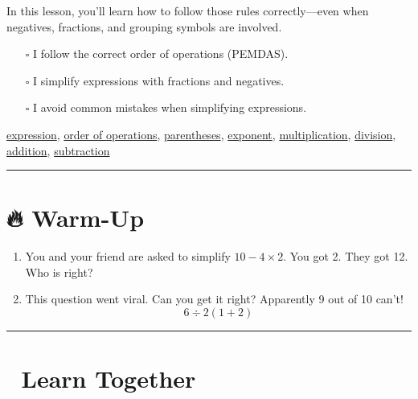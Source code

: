 \documentclass[
  letterpaper,
  DIV=11,
  numbers=noendperiod]{scrreprt}
\providecommand{\tightlist}{%
  \setlength{\itemsep}{0pt}\setlength{\parskip}{0pt}}
\begin{document}
In this lesson, you'll learn how to follow those rules correctly---even
when negatives, fractions, and grouping symbols are involved.

\begin{itemize}
\tightlist
\item[$\square$]
  I follow the correct order of operations (PEMDAS).
\item[$\square$]
  I simplify expressions with fractions and negatives.
\item[$\square$]
  I avoid common mistakes when simplifying expressions.
\end{itemize}

\href{./glossary.html\#glossary-expression}{expression},
\href{./glossary.html\#glossary-order-of-operations}{order of operations},
\href{./glossary.html\#glossary-parentheses}{parentheses},
\href{./glossary.html\#glossary-exponent}{exponent},
\href{./glossary.html\#glossary-multiplication}{multiplication},
\href{./glossary.html\#glossary-division}{division},
\href{./glossary.html\#glossary-addition}{addition},
\href{./glossary.html\#glossary-subtraction}{subtraction}

\begin{center}\rule{0.5\linewidth}{0.5pt}\end{center}

\section*{🔥 Warm-Up}\label{warm-up-6}


\begin{enumerate}
\def\labelenumi{\arabic{enumi}.}
\item
  You and your friend are asked to simplify \(10 - 4 \times 2\). You got
  2. They got 12. Who is right?
\item
  This question went viral. Can you get it right? Apparently 9 out of 10
  can't! \[
  6 \div 2(1 + 2)
  \]
\end{enumerate}

\begin{center}\rule{0.5\linewidth}{0.5pt}\end{center}

\section*{👥 Learn Together}\label{learn-together-6}
\end{document}
